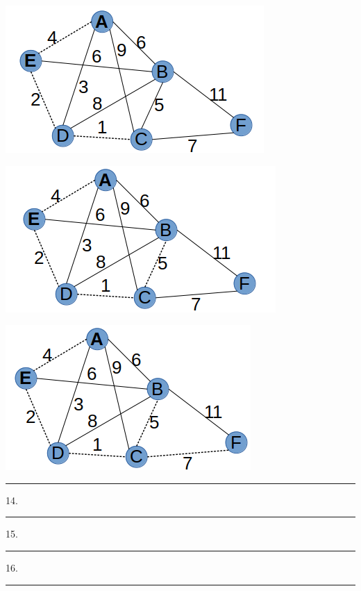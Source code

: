 \documentclass{article}
\begin{document}
\includegraphics[scale=0.5]{./P13/prims/3}

\includegraphics[scale=0.5]{./P13/prims/4}

\includegraphics[scale=0.5]{./P13/prims/5}







\noindent\rule{8cm}{0.4pt}

14. 

\noindent\rule{8cm}{0.4pt}


15.  

\noindent\rule{8cm}{0.4pt}

16. 


\noindent\rule{8cm}{0.4pt}
\end{document}

